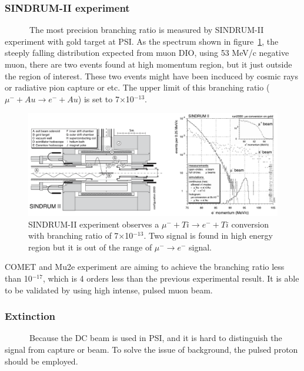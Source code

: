 \subsubsection{SINDRUM-II experiment}
~~~~~~The most precision branching ratio is measured by SINDRUM-II experiment with gold target at PSI.
As the spectrum shown in figure~\ref{sind}, the steeply falling distribution expected from muon DIO, using 53 MeV/c negative muon, there are two events found at high momentum region, but it just outside the region of interest.
These two events might have been incduced by cosmic rays or radiative pion capture or etc.
The upper limit of this branching ratio ($\mu^- + Au \rightarrow e^- + Au$) is set to 7$\times$10$^{-13}$.
\begin{figure}[H]
 \centering
 \includegraphics[scale=0.54]{chapter1/fig/sindrum.pdf}
 \caption{SINDRUM-II experiment observes a $\mu^- + Ti \rightarrow e^- + Ti$ conversion with branching ratio of 7$\times$10$^{-13}$. Two signal is found in high energy region but it is out of the range of $\mu^- \rightarrow e^-$ signal.}
 \label{sind}
\end{figure}
COMET and Mu2e experiment are aiming to achieve the branching ratio less than 10$^{-17}$, which is 4 orders less than the previous experimental result.
It is able to be validated by using high intense, pulsed muon beam.

\subsubsection{Extinction}
~~~~~~Because the DC beam is used in PSI, and it is hard to distinguish the signal from capture or beam.
To solve the issue of background, the pulsed proton should be employed.

